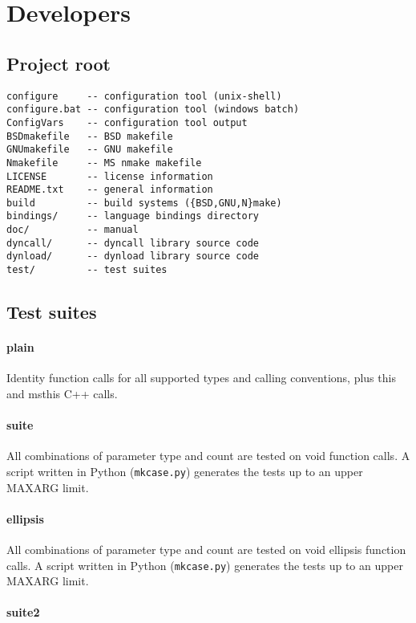 \newpage
\section{Developers}

\subsection{Project root}
\begin{verbatim}
configure     -- configuration tool (unix-shell)
configure.bat -- configuration tool (windows batch)
ConfigVars    -- configuration tool output
BSDmakefile   -- BSD makefile
GNUmakefile   -- GNU makefile
Nmakefile     -- MS nmake makefile
LICENSE       -- license information
README.txt    -- general information
build         -- build systems ({BSD,GNU,N}make)
bindings/     -- language bindings directory
doc/          -- manual
dyncall/      -- dyncall library source code
dynload/      -- dynload library source code
test/         -- test suites
\end{verbatim}

\subsection{Test suites}

\paragraph{plain}

Identity function calls for all supported types and calling conventions,
plus this and msthis C++ calls.

\paragraph{suite}

All combinations of parameter type and count are tested on void function calls.
A script written in Python ({\tt mkcase.py}) generates the tests up to
an upper MAXARG limit.

\paragraph{ellipsis}

All combinations of parameter type and count are tested on void ellipsis 
function calls. A script written in Python ({\tt mkcase.py}) generates the 
tests up to an upper MAXARG limit.

\paragraph{suite2}

